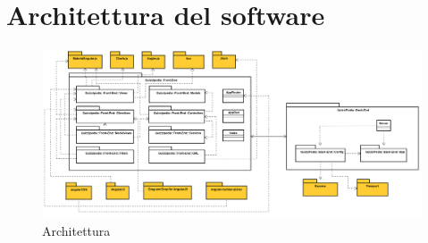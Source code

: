 \newpage

\section{Architettura del software}
\label{Architettura}
\begin{figure}[ht]
	\centering
	\includegraphics[scale=0.30]{UML/Package/QuizziPedia.png}
	\caption{Architettura}
\end{figure}
\FloatBarrier

